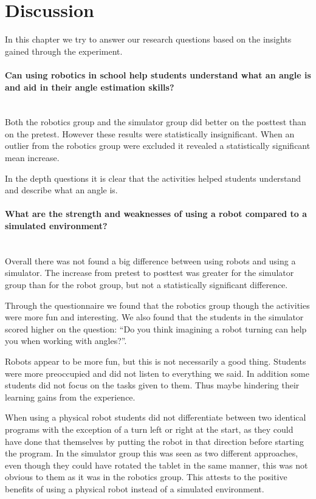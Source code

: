 \section{Discussion}
In this chapter we try to answer our research questions based on the insights gained through the experiment. 

\paragraph{Can using robotics in school help students understand what an angle is and aid in their angle estimation skills?}~\\
Both the robotics group and the simulator group did better on the posttest than on the pretest. However these results were statistically insignificant. When an outlier from the robotics group were excluded it revealed a statistically significant mean increase. 

In the depth questions it is clear that the activities helped students understand and describe what an angle is. 

\paragraph{What are the strength and weaknesses of using a robot compared to a simulated environment?}~\\
Overall there was not found a big difference between using robots and using a simulator.
The increase from pretest to posttest was greater for the simulator group than for the robot group, but not a statistically significant difference. 

Through the questionnaire we found that the robotics group though the activities were more fun and interesting. We also found that the students in the simulator scored higher on the question: ``Do you think imagining a robot turning can help you
when working with angles?''. 

Robots appear to be more fun, but this is not necessarily a good thing. Students were more preoccupied and did not listen to everything we said. In addition some students did not focus on the tasks given to them. Thus maybe hindering their learning gains from the experience. 

When using a physical robot students did not differentiate between two identical programs with the exception of a turn left or right at the start, as they could have done that themselves by putting the robot in that direction before starting the program. In the simulator group this was seen as two different approaches, even though they could have rotated the tablet in the same manner, this was not obvious to them as it was in the robotics group. This attests to the positive benefits of using a physical robot instead of a simulated environment. 


